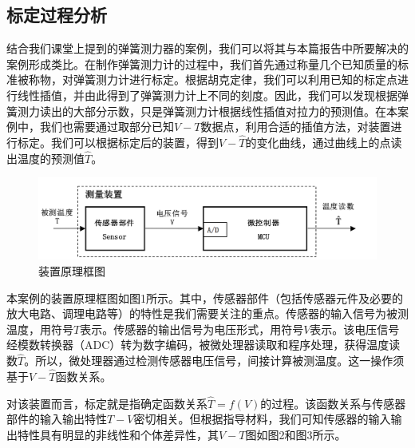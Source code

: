 \documentclass[10.5pt,twocolumn]{jbuaa}
\begin{document}
\subsection{标定过程分析}
结合我们课堂上提到的弹簧测力器的案例，我们可以将其与本篇报告中所要解决的案例形成类比。在制作弹簧测力计的过程中，我们首先通过称量几个已知质量的标准被称物，对弹簧测力计进行标定。根据胡克定律，我们可以利用已知的标定点进行线性插值，并由此得到了弹簧测力计上不同的刻度。因此，我们可以发现根据弹簧测力读出的大部分示数，只是弹簧测力计根据线性插值对拉力的预测值。在本案例中，我们也需要通过取部分已知$V-T$数据点，利用合适的插值方法，对装置进行标定。我们可以根据标定后的装置，得到$V-\hat T$的变化曲线，通过曲线上的点读出温度的预测值$\hat T$。
\begin{figure}[H]
\centering
\includegraphics [scale=0.4,trim=0 0 0 0]{./image/fig1.png}
\caption{装置原理框图}
\end{figure}
本案例的装置原理框图如图1所示。其中，传感器部件（包括传感器元件及必要的放大电路、调理电路等）的特性是我们需要关注的重点。传感器的输入信号为被测温度，用符号$T$表示。传感器的输出信号为电压形式，用符号$V$表示。该电压信号经模数转换器（ADC）转为数字编码，被微处理器读取和程序处理，获得温度读数$\hat T$。所以，微处理器通过检测传感器电压信号，间接计算被测温度。这一操作须基于$V-\hat T$函数关系。
 
对该装置而言，标定就是指确定函数关系$\hat T = f(V)$的过程。该函数关系与传感器部件的输入输出特性$T-V$密切相关。但根据指导材料，我们可知传感器的输入输出特性具有明显的非线性和个体差异性，其$V-T$图如图2和图3所示。
\end{document}

